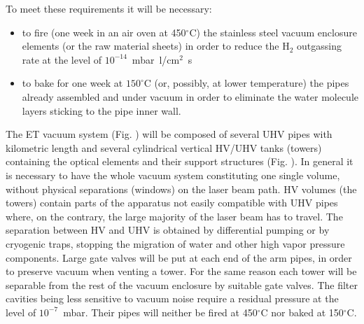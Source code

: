 To meet these requirements it will be necessary: 
\begin{itemize} 
\item to fire (one week in an air oven at 450$^\circ$C) the stainless steel vacuum enclosure elements (or the raw material sheets) in order to reduce the H$_2$ outgassing rate at the level of $10^{-14}$~mbar~l/cm$^{2}$~s 
\item to bake for one week at $150^\circ$C (or, possibly, at lower temperature) the pipes already assembled and under vacuum in order to eliminate the water molecule layers sticking to the pipe inner wall. 
\end{itemize} 


The ET vacuum system (Fig. )%
will be composed of several UHV pipes with kilometric length and several cylindrical vertical HV/UHV tanks (towers) containing the optical elements and their support structures (Fig. ).%
In general it is necessary to have the whole vacuum system constituting one single volume, without physical separations (windows) on the laser beam path. HV volumes (the towers) contain parts of the apparatus not easily compatible with UHV pipes where, on the contrary, the large majority of the laser beam has to travel. The separation between HV and UHV is obtained by differential pumping or by cryogenic traps, stopping the migration of water and other high vapor pressure components. Large gate valves will be put at each end of the arm pipes, in order to preserve vacuum when venting a tower. For the same reason each tower will be separable from the rest of the vacuum enclosure by suitable gate valves. The filter cavities being less sensitive to vacuum noise require a residual pressure at the level of $10^{-7}$~mbar. Their pipes will neither be fired at 450$^\circ$C nor baked at 150$^\circ$C. 



